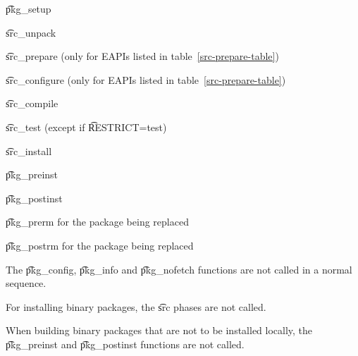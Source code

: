 \begin{compactitem}
\item \t{pkg\_setup}
\item \t{src\_unpack}
\item \t{src\_prepare} (only for EAPIs listed in table~\ref{src-prepare-table})
\item \t{src\_configure} (only for EAPIs listed in table~\ref{src-prepare-table})
\item \t{src\_compile}
\item \t{src\_test} (except if \t{RESTRICT=test})
\item \t{src\_install}
\item \t{pkg\_preinst}
\item \t{pkg\_postinst}
\item \t{pkg\_prerm} for the package being replaced
\item \t{pkg\_postrm} for the package being replaced
\end{compactitem}

The \t{pkg\_config}, \t{pkg\_info} and \t{pkg\_nofetch} functions are not called in a normal
sequence.

For installing binary packages, the \t{src} phases are not called.

When building binary packages that are not to be installed locally, the \t{pkg\_preinst}
and \t{pkg\_postinst} functions are not called.


